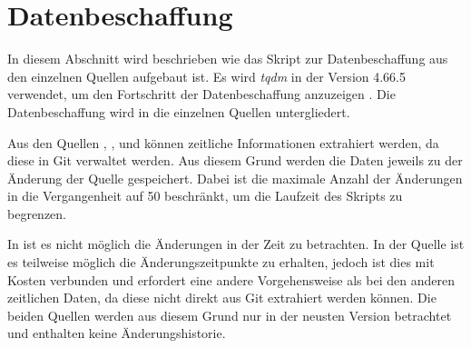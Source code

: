 \section{Datenbeschaffung}
\label{sec:datenbeschaffung}
In diesem Abschnitt wird beschrieben wie das Skript zur Datenbeschaffung aus den einzelnen Quellen aufgebaut ist.
Es wird \emph{tqdm} in der Version 4.66.5 verwendet, um den Fortschritt der Datenbeschaffung anzuzeigen \autocite{costa-luis_tqdm_2024}.
Die Datenbeschaffung wird in die einzelnen Quellen untergliedert.

Aus den Quellen , ,  und  können zeitliche Informationen extrahiert werden, da diese in Git verwaltet werden.
Aus diesem Grund werden die Daten jeweils zu der Änderung der Quelle gespeichert.
Dabei ist die maximale Anzahl der Änderungen in die Vergangenheit auf 50 beschränkt, um die Laufzeit des Skripts zu begrenzen.

In  ist es nicht möglich die Änderungen in der Zeit zu betrachten.
In der  Quelle ist es teilweise möglich die Änderungszeitpunkte zu erhalten, jedoch ist dies mit Kosten verbunden und erfordert eine andere Vorgehensweise als bei den anderen zeitlichen Daten, da diese nicht direkt aus Git extrahiert werden können.
Die beiden Quellen werden aus diesem Grund nur in der neusten Version betrachtet und enthalten keine Änderungshistorie.

